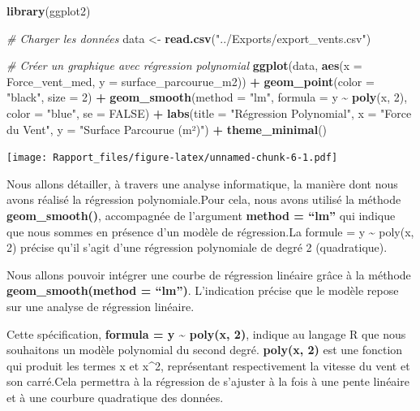 \documentclass[
]{article}
\newenvironment{Shaded}{\begin{snugshade}}{\end{snugshade}}
\newcommand{\AttributeTok}[1]{\textcolor[rgb]{0.13,0.29,0.53}{#1}}
\newcommand{\CommentTok}[1]{\textcolor[rgb]{0.56,0.35,0.01}{\textit{#1}}}
\newcommand{\ConstantTok}[1]{\textcolor[rgb]{0.56,0.35,0.01}{#1}}
\newcommand{\DecValTok}[1]{\textcolor[rgb]{0.00,0.00,0.81}{#1}}
\newcommand{\FunctionTok}[1]{\textcolor[rgb]{0.13,0.29,0.53}{\textbf{#1}}}
\newcommand{\NormalTok}[1]{#1}
\newcommand{\OtherTok}[1]{\textcolor[rgb]{0.56,0.35,0.01}{#1}}
\newcommand{\SpecialCharTok}[1]{\textcolor[rgb]{0.81,0.36,0.00}{\textbf{#1}}}
\newcommand{\StringTok}[1]{\textcolor[rgb]{0.31,0.60,0.02}{#1}}
\begin{document}
\begin{Shaded}
\begin{Highlighting}[]
\FunctionTok{library}\NormalTok{(ggplot2)}

\CommentTok{\# Charger les données}
\NormalTok{data }\OtherTok{\textless{}{-}} \FunctionTok{read.csv}\NormalTok{(}\StringTok{"../Exports/export\_vents.csv"}\NormalTok{)}

\CommentTok{\# Créer un graphique avec régression polynomial}
\FunctionTok{ggplot}\NormalTok{(data, }\FunctionTok{aes}\NormalTok{(}\AttributeTok{x =}\NormalTok{ Force\_vent\_med, }\AttributeTok{y =}\NormalTok{ surface\_parcourue\_m2)) }\SpecialCharTok{+}
  \FunctionTok{geom\_point}\NormalTok{(}\AttributeTok{color =} \StringTok{"black"}\NormalTok{, }\AttributeTok{size =} \DecValTok{2}\NormalTok{) }\SpecialCharTok{+} 
  \FunctionTok{geom\_smooth}\NormalTok{(}\AttributeTok{method =} \StringTok{"lm"}\NormalTok{, }\AttributeTok{formula =}\NormalTok{ y }\SpecialCharTok{\textasciitilde{}} \FunctionTok{poly}\NormalTok{(x, }\DecValTok{2}\NormalTok{), }\AttributeTok{color =} \StringTok{"blue"}\NormalTok{, }\AttributeTok{se =} \ConstantTok{FALSE}\NormalTok{) }\SpecialCharTok{+} 
  \FunctionTok{labs}\NormalTok{(}\AttributeTok{title =} \StringTok{"Régression Polynomial"}\NormalTok{, }
       \AttributeTok{x =} \StringTok{"Force du Vent"}\NormalTok{, }
       \AttributeTok{y =} \StringTok{"Surface Parcourue (m²)"}\NormalTok{) }\SpecialCharTok{+}
  \FunctionTok{theme\_minimal}\NormalTok{()}
\end{Highlighting}
\end{Shaded}

\texttt{[image: Rapport\_files/figure-latex/unnamed-chunk-6-1.pdf]}

Nous allons détailler, à travers une analyse informatique, la manière
dont nous avons réalisé la régression polynomiale.Pour cela, nous avons
utilisé la méthode \textbf{geom\_smooth()}, accompagnée de l'argument
\textbf{method = ``lm''} qui indique que nous sommes en présence d'un
modèle de régression.La formule = y \textasciitilde{} poly(x, 2) précise
qu'il s'agit d'une régression polynomiale de degré 2 (quadratique).

Nous allons pouvoir intégrer une courbe de régression linéaire grâce à
la méthode \textbf{geom\_smooth(method = ``lm'')}. L'indication précise
que le modèle repose sur une analyse de régression linéaire.

Cette spécification, \textbf{formula = y \textasciitilde{} poly(x, 2)},
indique au langage R que nous souhaitons un modèle polynomial du second
degré. \textbf{poly(x, 2)} est une fonction qui produit les termes x et
x\^{}2, représentant respectivement la vitesse du vent et son carré.Cela
permettra à la régression de s'ajuster à la fois à une pente linéaire et
à une courbure quadratique des données.
\end{document}
